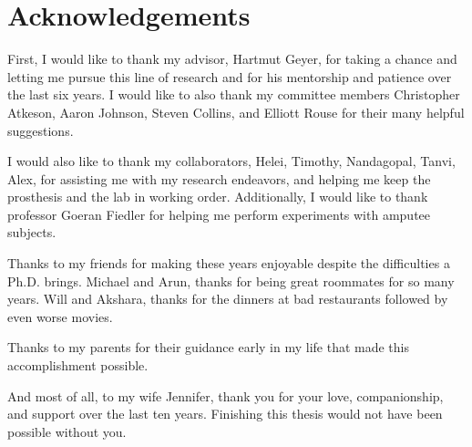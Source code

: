 \chapter*{Acknowledgements}

First, I would like to thank my advisor, Hartmut Geyer, for taking a chance and
letting me pursue this line of research and for his mentorship and patience over
the last six years. I would like to also thank my committee members Christopher
Atkeson, Aaron Johnson, Steven Collins, and Elliott Rouse for their many helpful
suggestions.

I would also like to thank my collaborators, Helei, Timothy, Nandagopal, Tanvi,
Alex, for assisting me with my research endeavors, and helping me keep the
prosthesis and the lab in working order. Additionally, I would like to thank
professor Goeran Fiedler for helping me perform experiments with amputee
subjects.

Thanks to my friends for making these years enjoyable despite the difficulties a
Ph.D. brings. Michael and Arun, thanks for being great roommates for so many
years. Will and Akshara, thanks for the dinners at bad restaurants followed by
even worse movies.

Thanks to my parents for their guidance early in my life that made this
accomplishment possible.

And most of all, to my wife Jennifer, thank you for your love, companionship,
and support over the last ten years. Finishing this thesis would not have been
possible without you.
